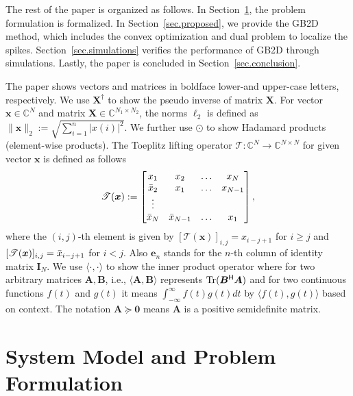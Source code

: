 \documentclass[conference,10pt]{IEEEtran}
\theoremstyle{remark}
\theoremstyle{plain}
\theoremstyle{definition}
\theoremstyle{remark}
\begin{document}
The rest of the paper is organized as follows.  In Section~\ref{sec.model}, the problem formulation is formalized. In Section~\ref{sec.proposed}, we provide the \ac{GB2D} method, which includes the convex optimization and dual problem to localize the spikes. Section~\ref{sec.simulations} verifies the performance of \ac{GB2D} through simulations. Lastly, the paper is concluded in Section~\ref{sec.conclusion}.


The paper shows vectors and matrices in boldface lower-and upper-case letters, respectively. We use $\bm{X}^{\dagger}$ to show the pseudo inverse of matrix $\bm{X}$.  For vector $\bm{x}\in\mathbb{C}^N$ and matrix $\bm{X}\in\mathbb{C}^{N_1\times N_2}$, the norms $\ell_2$ is defined as $\|\bm{x}\|_2:= \sqrt{\sum\nolimits_{i=1}^n|x(i)|^2}$. 
We further use $\odot$ to show Hadamard products (element-wise products). The Toeplitz lifting operator $\mathscr{T}: \mathbb{C}^N \to \mathbb{C}^{N\times N}$ for given vector $\bm{x}$  is defined as follows
\begin{equation}
    \label{eq:Hankel}
    \mathscr{T}(\bm{x}): = \begin{bmatrix}
        x_{1} & x_{2} & \dots & x_{N} \\
        \Bar{x}_{2} & x_{1} & \dots & x_{N-1} \\
        \vdots \\
        \Bar{x}_{N} & \Bar{x}_{N-1} & \dots & x_{1} 
    \end{bmatrix}, 
\end{equation}
where the $(i,j)$-th  element is given by $[\mathscr{T}(\bm{x})]_{i,j} = x_{i-j+1}$ for $i\geq j$ and $[\mathscr{T}(\bm{x})]_{i,j} = \Bar{x}_{i-j+1}$ for $i<j$. Also $\bm{e}_n$ stands for the $n$-th column of identity matrix $\bm{I}_{N}$. We use $\langle \cdot, \cdot \rangle$ to show the inner product operator where for two arbitrary matrices $\bm{A}, \bm{B}$, i.e., $\langle \bm{A}, \bm{B}\rangle$ represents ${\rm Tr} (\bm{B}^{\mathsf  H}\bm{A})$ and for two continuous functions $f(t)$ and $g(t)$ it means $\int_{-\infty}^{\infty}f(t)g(t)dt$ by $\langle f(t), g(t) \rangle$ based on context. The notation $\bm{A}\succeq \bm{0}$ means $\bm{A}$ is a positive semidefinite matrix.

 


 \section{System Model and Problem Formulation}\label{sec.model}
\end{document}
